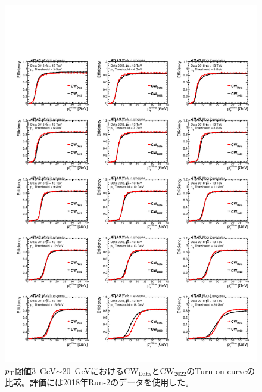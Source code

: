 \begin{figure}[p]
  \centering
  \includegraphics[clip, width=14cm]{fig/5/v05vsv06_MU3_20_re.pdf}
  \caption{$p_{\rm{T}}$閾値3~GeV$\sim$20~GeVにおける$\mathrm{CW_{Data}}$と$\mathrm{CW_{2022}}$のTurn-on curveの比較。評価には2018年Run-2のデータを使用した。}
  \label{fig:v05v06_1_9_Data}
\end{figure}



